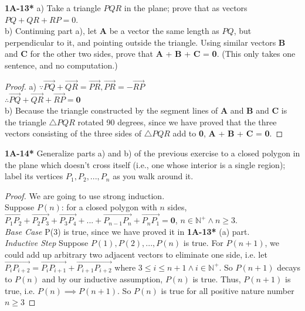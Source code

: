 \documentclass{article}
\begin{document}
\textbf{1A-13*} a) Take a triangle $PQR$ in the plane; prove that as vectors $PQ+QR+RP = 0$.
\\ b) Continuing part a), let \textbf{A} be a vector the same length as $PQ$, but perpendicular to it, and pointing outside the triangle. Using similar vectors \textbf{B} and \textbf{C} for the other two sides, prove that \textbf{A} + \textbf{B} + \textbf{C} = \textbf{0}. (This only takes one sentence, and no computation.)
\begin{proof}
a) $\because \overrightarrow{PQ} + \overrightarrow{QR} = \overrightarrow{PR}, \overrightarrow{PR} = -\overrightarrow{RP}$
\\ $\therefore \overrightarrow{PQ} + \overrightarrow{QR} + \overrightarrow{RP} = \mathbf{0}$
\\ b) Because the triangle constructed by the segment lines of \textbf{A} and \textbf{B} and \textbf{C} is the triangle $\bigtriangleup PQR$ rotated 90 degrees, since we have proved that the three vectors consisting of the three sides of $\bigtriangleup PQR$ add to \textbf{0}, \textbf{A} + \textbf{B} + \textbf{C} = \textbf{0}.
\end{proof}
\textbf{1A-14*} Generalize parts a) and b) of the previous exercise to a closed polygon in the plane which doesn't cross itself (i.e., one whose interior is a single region); label its vertices $P_1, P_2,...,P_n$ as you walk around it.
\begin{proof}
We are going to use strong induction. 
\\Suppose $P(n)$: for a closed polygon with $n$ sides, $\overrightarrow{P_1P_2} + \overrightarrow{P_2P_3} + \overrightarrow{P_3P_4} + ... + \overrightarrow{P_{n-1}P_n} + \overrightarrow{P_nP_1} = \mathbf{0}$, $n \in \mathbb{N}^+ \wedge n \geq 3$.
\\ \textit{Base Case} P(3) is true, since we have proved it in \textbf{1A-13*} (a) part.
\\ \textit{Inductive Step} Suppose $P(1), P(2), ..., P(n)$ is true. For $P(n+1)$, we could add up arbitrary two adjacent vectors to eliminate one side, i.e. let $\overrightarrow{P_iP_{i+2}} = \overrightarrow{P_iP_{i+1}} + \overrightarrow{P_{i+1}P_{i+2}}$ where $ 3 \leq i \leq n+1 \wedge i \in \mathbb{N}^+$. So $P(n+1)$ decays to $P(n)$ and by our inductive assumption, $P(n)$ is true. Thus, $P(n+1)$ is true, i.e. $P(n) \implies P(n+1)$. So $P(n)$ is true for all positive nature number $n \geq 3$
\end{proof}
\end{document}
